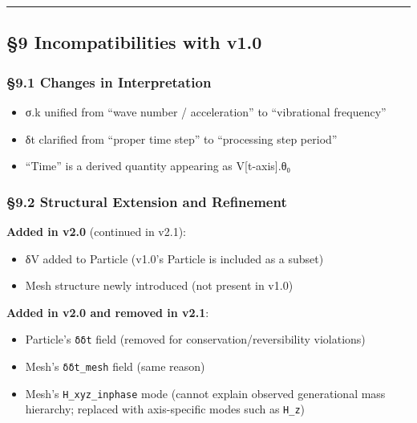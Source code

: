 \documentclass[a4paper,11pt]{article}
\providecommand{\tightlist}{\setlength{\itemsep}{0pt}\setlength{\parskip}{0pt}}
\begin{document}
\begin{center}\rule{0.5\linewidth}{0.5pt}\end{center}

\subsection{§9 Incompatibilities with
v1.0}\label{incompatibilities-with-v1.0}

\subsubsection{§9.1 Changes in
Interpretation}\label{changes-in-interpretation}

\begin{itemize}
\tightlist
\item
  σ.k unified from ``wave number / acceleration'' to ``vibrational
  frequency''
\item
  δt clarified from ``proper time step'' to ``processing step period''
\item
  ``Time'' is a derived quantity appearing as V{[}t-axis{]}.θ₀
\end{itemize}

\subsubsection{§9.2 Structural Extension and
Refinement}\label{structural-extension-and-refinement}

\textbf{Added in v2.0} (continued in v2.1):

\begin{itemize}
\tightlist
\item
  δV added to Particle (v1.0's Particle is included as a subset)
\item
  Mesh structure newly introduced (not present in v1.0)
\end{itemize}

\textbf{Added in v2.0 and removed in v2.1}:

\begin{itemize}
\tightlist
\item
  Particle's \texttt{δδt} field (removed for conservation/reversibility
  violations)
\item
  Mesh's \texttt{δδt\_mesh} field (same reason)
\item
  Mesh's \texttt{H\_xyz\_inphase} mode (cannot explain observed
  generational mass hierarchy; replaced with axis-specific modes such as
  \texttt{H\_z})
\end{itemize}
\end{document}
